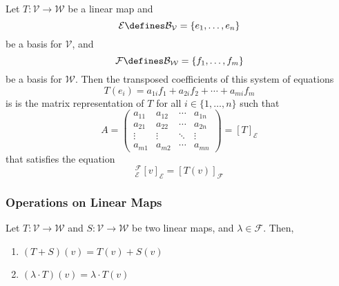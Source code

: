 \begin{thm}\label{thm-matrix-rep-linear-operator}
	Let $T:\mathcal{V}\to\mathcal{W}$ be a linear map and
	\begin{equation*}
		\mathcal{E}\defines\mathcal{B}_\mathcal{V}=\{e_1,\dots,e_n\}
	\end{equation*}
	be a basis for $\mathcal{V}$, and
	\begin{equation*}
		\mathcal{F}\defines\mathcal{B}_\mathcal{W}=\{f_1,\dots,f_m\}
	\end{equation*}
	be a basis for $\mathcal{W}$.
	Then the transposed coefficients of this system of equations
	\begin{equation}
		T(e_i)=a_{1i}f_1+a_{2i}f_{2}+\cdots+a_{mi}f_m
	\end{equation}
	is is the matrix representation of $T$ for all $i\in\{1,\dots,n\}$ such that
	\begin{equation}
		A=\begin{pmatrix}
			a_{11} & a_{12} & \cdots & a_{1n} \\
			a_{21} & a_{22} & \cdots & a_{2n} \\
			\vdots & \vdots & \ddots & \vdots \\
			a_{m1} & a_{m2} & \cdots & a_{mn}
		\end{pmatrix}=[T]_\mathcal{E}
	\end{equation}
	that satisfies the equation
	\begin{equation}
		[T]_\mathcal{E}^\mathcal{F}[v]_\mathcal{E}=[T(v)]_\mathcal{F}
	\end{equation}
\end{thm}

\subsubsection{Operations on Linear Maps}\label{subsubsec-operations-on-linear-maps}

\begin{definition}\label{def-linear-maps-operations}
	Let $T:\mathcal{V}\to\mathcal{W}$ and $S:\mathcal{V}\to\mathcal{W}$
	be two linear maps, and $\lambda\in\mathcal{F}$. Then,
	\begin{enumerate}
		\item $(T+S)(v)=T(v)+S(v)$
		\item $(\lambda\cdot T)(v)=\lambda\cdot T(v)$
	\end{enumerate}
\end{definition}

